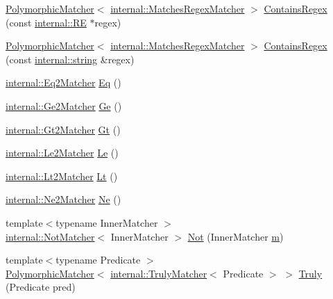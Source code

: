 \begin{DoxyCompactItemize}
\item 
\hyperlink{classtesting_1_1_polymorphic_matcher}{Polymorphic\+Matcher}$<$ \hyperlink{classtesting_1_1internal_1_1_matches_regex_matcher}{internal\+::\+Matches\+Regex\+Matcher} $>$ \hyperlink{namespacetesting_a899838630a71376aa071dfd7c500f2ca}{Contains\+Regex} (const \hyperlink{classtesting_1_1internal_1_1_r_e}{internal\+::\+RE} $\ast$regex)
\item 
\hyperlink{classtesting_1_1_polymorphic_matcher}{Polymorphic\+Matcher}$<$ \hyperlink{classtesting_1_1internal_1_1_matches_regex_matcher}{internal\+::\+Matches\+Regex\+Matcher} $>$ \hyperlink{namespacetesting_ad8efafa15630a8274f41f5e22f8f0e49}{Contains\+Regex} (const \hyperlink{namespacetesting_1_1internal_a8e8ff5b11e64078831112677156cb111}{internal\+::string} \&regex)
\item 
\hyperlink{classtesting_1_1internal_1_1_eq2_matcher}{internal\+::\+Eq2\+Matcher} \hyperlink{namespacetesting_aa7771a34f092fd6f1dca2c82fb2a36a1}{Eq} ()
\item 
\hyperlink{classtesting_1_1internal_1_1_ge2_matcher}{internal\+::\+Ge2\+Matcher} \hyperlink{namespacetesting_a8cc0a6519e30bedf52c6e53c71e18265}{Ge} ()
\item 
\hyperlink{classtesting_1_1internal_1_1_gt2_matcher}{internal\+::\+Gt2\+Matcher} \hyperlink{namespacetesting_a3eaae6408f77ba7d87ca2d6a21dbde77}{Gt} ()
\item 
\hyperlink{classtesting_1_1internal_1_1_le2_matcher}{internal\+::\+Le2\+Matcher} \hyperlink{namespacetesting_a04def1c627ea7e3fce2f08cb06e83ebc}{Le} ()
\item 
\hyperlink{classtesting_1_1internal_1_1_lt2_matcher}{internal\+::\+Lt2\+Matcher} \hyperlink{namespacetesting_a3b4d6d29d715c1bf219163f5206b53d4}{Lt} ()
\item 
\hyperlink{classtesting_1_1internal_1_1_ne2_matcher}{internal\+::\+Ne2\+Matcher} \hyperlink{namespacetesting_a0cde8994764617eebc751e682c28d4ae}{Ne} ()
\item 
{\footnotesize template$<$typename Inner\+Matcher $>$ }\\\hyperlink{classtesting_1_1internal_1_1_not_matcher}{internal\+::\+Not\+Matcher}$<$ Inner\+Matcher $>$ \hyperlink{namespacetesting_a3d7d0dda7e51b13fe2f5aa28e23ed6b6}{Not} (Inner\+Matcher \hyperlink{variables__e_8js_aab4247b6acebcba996939b177f483c14}{m})
\item 
{\footnotesize template$<$typename Predicate $>$ }\\\hyperlink{classtesting_1_1_polymorphic_matcher}{Polymorphic\+Matcher}$<$ \hyperlink{classtesting_1_1internal_1_1_truly_matcher}{internal\+::\+Truly\+Matcher}$<$ Predicate $>$ $>$ \hyperlink{namespacetesting_a5faf05cfaae6074439960048e478b1c8}{Truly} (Predicate pred)

\end{DoxyCompactItemize}
